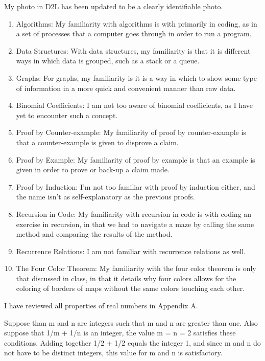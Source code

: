 \documentclass{article}
\author{Joshua Harthan}
\begin{document}
My photo in D2L has been updated to be a clearly identifiable photo.


\clearpage
\header

\begin{enumerate}[(1)]
    \item Algorithms: My familiarity with algorithms is with primarily in coding, as in a set of processes that a computer goes through in order to run a program.
    \item Data Structures: With data structures, my familiarity is that it is different ways in which data is grouped, such as a stack or a queue. 
    \item Graphs: For graphs, my familiarity is it is a way in which to show some type of information in a more quick and convenient manner than raw data.
    \item Binomial Coefficients: I am not too aware of binomial coefficients, as I have yet to encounter such a concept.
    \item Proof by Counter-example: My familiarity of proof by counter-example is that a counter-example is given to disprove a claim.
    \item Proof by Example: My familiarity of proof by example is that an example is given in order to prove or back-up a claim made.
    \item Proof by Induction: I'm not too familiar with proof by induction either, and the name isn't as self-explanatory as the previous proofs.
    \item Recursion in Code: My familiarity with recursion in code is with coding an exercise in recursion, in that we had to navigate a maze by calling the same method and comparing the results of the method.
    \item Recurrence Relations: I am not familiar with recurrence relations as well.
    \item The Four Color Theorem: My familiarity with the four color theorem is only that discussed in class, in that it details why four colors allows for the coloring of borders of maps without the same colors touching each other.
\end{enumerate}

\clearpage
\header
 I have reviewed all properties of real numbers in Appendix A.


\clearpage
\header
Suppose than m and n are integers such that m and n are greater than one. Also suppose that 1/m + 1/n is an integer, the value m = n = 2 satisfies these conditions. Adding together 1/2 + 1/2 equals the integer 1, and since m and n do not have to be distinct integers, this value for m and n is satisfactory.
\end{document}
